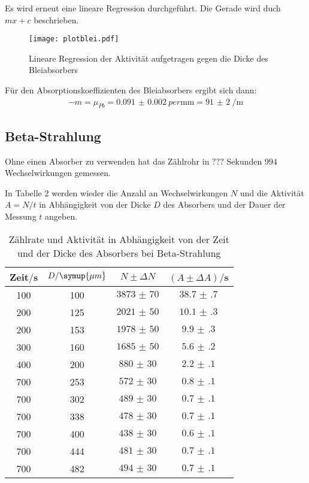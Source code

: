 Es wird erneut eine lineare Regression durchgeführt. Die Gerade wird duch $mx + c$ beschrieben.

\begin{figure}[H]
  \centering
  \texttt{[image: plotblei.pdf]}
  \caption{Lineare Regression der Aktivität aufgetragen gegen die Dicke des Bleiabsorbers}
  \label{fig:plot}
\end{figure}

Für den Absorptionskoeffizienten des Bleiabsorbers ergibt sich dann:
\begin{align*}
  -m = \mu_{Pb} = \SI{0.091(2)}{per\milli\meter} = \SI{91(2)}{\per\meter}
\end{align*}


\subsection{Beta-Strahlung}

Ohne einen Absorber zu verwenden hat das Zählrohr in $???$ Sekunden $994$ Wechselwirkungen gemessen.

In Tabelle 2 werden wieder die Anzahl an Wechselwirkungen $N$ und die Aktivität $A = N/t$ in Abhängigkeit von der Dicke $D$ des Absorbers und der
Dauer der Messung $t$ angeben.

\begin{table}[H]
  \centering
  \caption{Zählrate und Aktivität in Abhängigkeit von der Zeit und der Dicke des Absorbers bei Beta-Strahlung}
  \label{tab:}
  \begin{tabular}{c c c c}
    \toprule
    Zeit$/$s & $D/\symup{\mu m}$ & $N \pm \Delta N$ & $(A \pm \Delta A)/$s\\
    \midrule
    100 & 100 & $\num{3873(70)}$  &  $\num{38.7(7)}$ \\
    200 & 125 & $\num{2021(50)}$ &   $\num{10.1(3)}$ \\
    200 & 153 & $\num{1978(50)}$ &   $\num{9.9(3)}$ \\
    300 & 160 & $\num{1685(50)}$ &  $\num{5.6(2)}$ \\
    400 & 200 & $\num{880(30)}$ & $\num{2.2(1)}$ \\
    700 & 253 & $\num{572(30)}$ & $\num{0.8(1)}$ \\
    700 & 302 & $\num{489(30)}$ & $\num{0.7(1)}$ \\
    700 & 338 & $\num{478(30)}$ & $\num{0.7(1)}$ \\
    700 & 400 & $\num{438(30)}$ & $\num{0.6(1)}$ \\
    700 & 444 & $\num{481(30)}$ & $\num{0.7(1)}$ \\
    700 & 482 & $\num{494(30)}$ & $\num{0.7(1)}$ \\
    \bottomrule
  \end{tabular}
\end{table}

